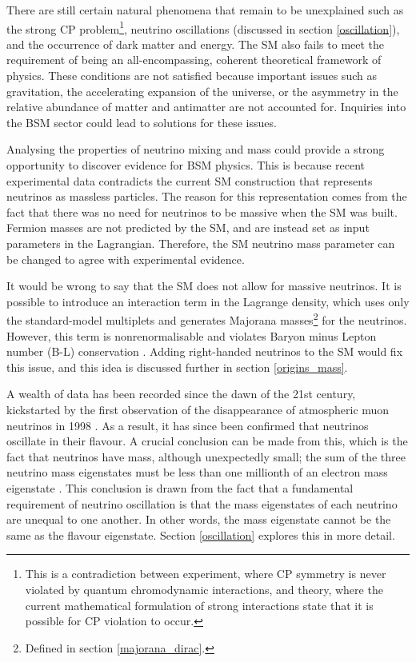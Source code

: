 \documentclass[10pt]{article}
\begin{document}
There are still certain natural phenomena that remain to be unexplained such as the strong CP problem\footnote{This is a contradiction between experiment, where CP symmetry is never violated by quantum chromodynamic interactions, and theory, where the current mathematical formulation of strong interactions state that it is possible for CP violation to occur.}, neutrino oscillations (discussed in section \ref{oscillation}), and the occurrence of dark matter and energy. The SM also fails to meet the requirement of being an all-encompassing, coherent theoretical framework of physics. These conditions are not satisfied because important issues such as gravitation, the accelerating expansion of the universe, or the asymmetry in the relative abundance of matter and antimatter are not accounted for. Inquiries into the BSM sector could lead to solutions for these issues.

Analysing the properties of neutrino mixing and mass could provide a strong opportunity to discover evidence for BSM physics. This is because recent experimental data contradicts the current SM construction that represents neutrinos as massless particles. The reason for this representation comes from the fact that there was no need for neutrinos to be massive when the SM was built. Fermion masses are not predicted by the SM, and are instead set as input parameters in the Lagrangian. Therefore, the SM neutrino mass parameter can be changed to agree with experimental evidence.

It would be wrong to say that the SM does not allow for massive neutrinos. It is possible to introduce an interaction term in the Lagrange density, which uses only the standard-model multiplets and generates Majorana masses\footnote{Defined in section \ref{majorana_dirac}.} for the neutrinos. However, this term is nonrenormalisable and violates Baryon minus Lepton number (B-L) conservation \cite{KLINKHAMER_2013}. Adding right-handed neutrinos to the SM would fix this issue, and this idea is discussed further in section \ref{origins_mass}.

A wealth of data has been recorded since the dawn of the 21st century, kickstarted by the first observation of the disappearance of atmospheric muon neutrinos in 1998 \cite{2016NuPhB.908....1O,atmospheric_neutrinos}. As a result, it has since been confirmed that neutrinos oscillate in their flavour. A crucial conclusion can be made from this, which is the fact that neutrinos have mass, although unexpectedly small; the sum of the three neutrino mass eigenstates must be less than one millionth of an electron mass eigenstate \cite{Mertens_2016, cooper2016masses}. This conclusion is drawn from the fact that a fundamental requirement of neutrino oscillation is that the mass eigenstates of each neutrino are unequal to one another. In other words, the mass eigenstate cannot be the same as the flavour eigenstate. Section \ref{oscillation} explores this in more detail.
\end{document}
